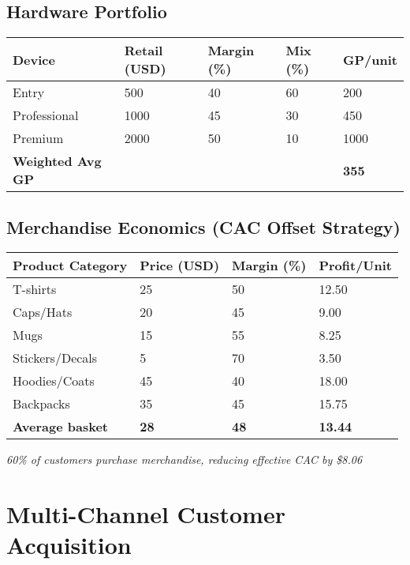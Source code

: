 \documentclass[11pt]{article}
\newcommand{\hwEntryPrice}{500}
\newcommand{\hwEntryMargin}{40}
\newcommand{\hwEntryMix}{60}
\newcommand{\hwProfPrice}{1000}
\newcommand{\hwProfMargin}{45}
\newcommand{\hwProfMix}{30}
\newcommand{\hwPremiumPrice}{2000}
\newcommand{\hwPremiumMargin}{50}
\newcommand{\hwPremiumMix}{10}
\newcommand{\merchAvgPrice}{28}
\newcommand{\merchAvgMargin}{48}
\newcommand{\merchAvgProfit}{13.44}
\newcommand{\merchAttachRate}{60}
\begin{document}
\subsection{Hardware Portfolio}
\begin{table}[H]
\centering
\begin{tabularx}{\linewidth}{l Y Y Y Y}
\toprule
Device & Retail (USD) & Margin (\%)\cite{industrybenchmark2024} & Mix (\%) & GP/unit \\\midrule
Entry        & \hwEntryPrice  & \hwEntryMargin & \hwEntryMix & 200 \\
Professional & \hwProfPrice & \hwProfMargin & \hwProfMix & 450 \\
Premium      & \hwPremiumPrice & \hwPremiumMargin & \hwPremiumMix & 1000 \\\midrule
\textbf{Weighted Avg GP} &  &  &  & \textbf{355} \\
\bottomrule
\end{tabularx}
\end{table}

\subsection{Merchandise Economics (CAC Offset Strategy)}
\begin{table}[H]
\centering
\begin{tabularx}{\linewidth}{l Y Y Y}
\toprule
Product Category & Price (USD) & Margin (\%)\cite{printful2023} & Profit/Unit \\\midrule
T-shirts & 25 & 50 & 12.50 \\
Caps/Hats & 20 & 45 & 9.00 \\
Mugs & 15 & 55 & 8.25 \\
Stickers/Decals & 5 & 70 & 3.50 \\
Hoodies/Coats & 45 & 40 & 18.00 \\
Backpacks & 35 & 45 & 15.75 \\\midrule
\textbf{Average basket} & \textbf{\merchAvgPrice} & \textbf{\merchAvgMargin} & \textbf{\merchAvgProfit} \\
\bottomrule
\end{tabularx}
\end{table}
\textit{\merchAttachRate\% of customers purchase merchandise, reducing effective CAC by \$8.06}\cite{shopify2024}

\section{Multi-Channel Customer Acquisition}
\end{document}
